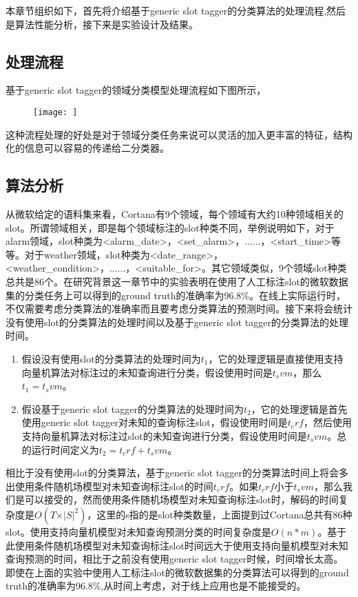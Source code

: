 \documentclass[master]{njuthesis}
\begin{document}
    本章节组织如下，首先将介绍基于generic slot tagger的分类算法的处理流程,然后是算法性能分析，接下来是实验设计及结果。

\subsection{处理流程}

    基于generic slot tagger的领域分类模型处理流程如下图所示，
    \begin{figure}[htbp]
      \centering
      \texttt{[image: ]}
      \caption{}\label{fig:test1}
    \end{figure}
    
    这种流程处理的好处是对于领域分类任务来说可以灵活的加入更丰富的特征，结构化的信息可以容易的传递给二分类器。

\subsection{算法分析}

    从微软给定的语料集来看，Cortana有9个领域，每个领域有大约10种领域相关的slot。所谓领域相关，即是每个领域标注的slot种类不同，举例说明如下，对于alarm领域，slot种类为<alarm\_date>，<set\_alarm>，......，<start\_time>等等。对于weather领域，slot种类为<date\_range>，<weather\_condition>，......，<suitable\_for>。其它领域类似，9个领域slot种类总共是86个。在研究背景这一章节中的实验表明在使用了人工标注slot的微软数据集的分类任务上可以得到的ground truth的准确率为96.8\%。在线上实际运行时，不仅需要考虑分类算法的准确率而且要考虑分类算法的预测时间。接下来将会统计没有使用slot的分类算法的处理时间以及基于generic slot tagger的分类算法的处理时间。

\begin{enumerate}
 \item 假设没有使用slot的分类算法的处理时间为$t_1$，它的处理逻辑是直接使用支持向量机算法对标注过的未知查询进行分类，假设使用时间是$t_svm$，那么$t_1 = t_svm$。
 \item 假设基于generic slot tagger的分类算法的处理时间为$t_2$，它的处理逻辑是首先使用generic slot tagger对未知的查询标注slot，假设使用时间是$t_crf$，然后使用支持向量机算法对标注过slot的未知查询进行分类，假设使用时间是$t_svm$。总的运行时间定义为$t_2 = t_crf + t_svm$。
\end{enumerate}

    相比于没有使用slot的分类算法，基于generic slot tagger的分类算法时间上将会多出使用条件随机场模型对未知查询标注slot的时间$t_crf$。如果$t_crf$小于$t_svm$，那么我们是可以接受的，然而使用条件随机场模型对未知查询标注slot时，解码的时间复杂度是$O\left(T\times\vert S \vert^2\right)$，这里的s指的是slot种类数量，上面提到过Cortana总共有86种slot。使用支持向量机模型对未知查询预测分类的时间复杂度是$O\left(n*m\right)$。基于此使用条件随机场模型对未知查询标注slot时间远大于使用支持向量机模型对未知查询预测的时间，相比于之前没有使用generic slot tagger时候，时间增长太高。即使在上面的实验中使用人工标注slot的微软数据集的分类算法可以得到的ground truth的准确率为96.8\%,从时间上考虑，对于线上应用也是不能接受的。
\end{document}
